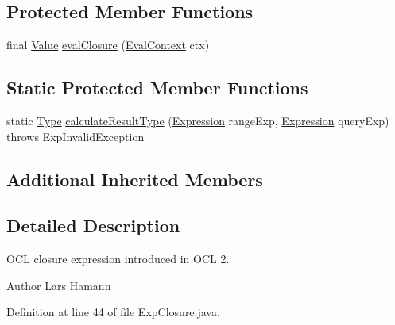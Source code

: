 \subsection*{Protected Member Functions}
\begin{DoxyCompactItemize}
\item 
final \hyperlink{classorg_1_1tzi_1_1use_1_1uml_1_1ocl_1_1value_1_1_value}{Value} \hyperlink{classorg_1_1tzi_1_1use_1_1uml_1_1ocl_1_1expr_1_1_exp_closure_aa313c3fd379bc142948a9dbfc0049271}{eval\-Closure} (\hyperlink{classorg_1_1tzi_1_1use_1_1uml_1_1ocl_1_1expr_1_1_eval_context}{Eval\-Context} ctx)
\end{DoxyCompactItemize}
\subsection*{Static Protected Member Functions}
\begin{DoxyCompactItemize}
\item 
static \hyperlink{interfaceorg_1_1tzi_1_1use_1_1uml_1_1ocl_1_1type_1_1_type}{Type} \hyperlink{classorg_1_1tzi_1_1use_1_1uml_1_1ocl_1_1expr_1_1_exp_closure_a9eb6eeead61b0aef9cfe859e053913a2}{calculate\-Result\-Type} (\hyperlink{classorg_1_1tzi_1_1use_1_1uml_1_1ocl_1_1expr_1_1_expression}{Expression} range\-Exp, \hyperlink{classorg_1_1tzi_1_1use_1_1uml_1_1ocl_1_1expr_1_1_expression}{Expression} query\-Exp)  throws Exp\-Invalid\-Exception 
\end{DoxyCompactItemize}
\subsection*{Additional Inherited Members}


\subsection{Detailed Description}
O\-C\-L closure expression introduced in O\-C\-L 2. \begin{DoxyAuthor}{Author}
Lars Hamann 
\end{DoxyAuthor}


Definition at line 44 of file Exp\-Closure.\-java.



